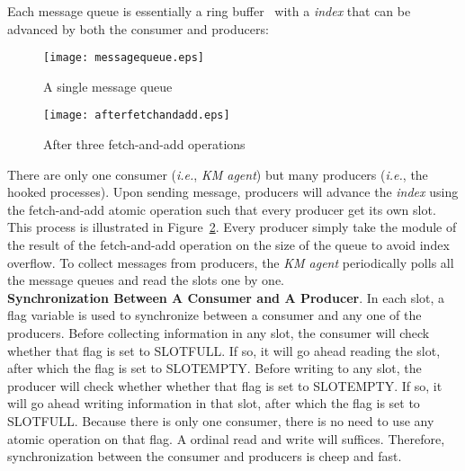 \documentclass[letterpaper,twocolumn,10pt]{article}
\begin{document}
Each message queue is essentially a ring buffer~\cite{ringbufferLee:2009,
Lynx:2016} with a \textit{index} that can be advanced by both the consumer and
producers: 

\begin{subfigures}
    \begin{figure}[H]
    \centering
    \texttt{[image: messagequeue.eps]}
    \caption{\label{fig:singlemq}A single message queue}
\end{figure}
    \begin{figure}[H]
    \centering
    \texttt{[image: afterfetchandadd.eps]}
    \caption{\label{fig:afterfa}After three fetch-and-add operations}
\end{figure}
\end{subfigures}

\noindent
There are only one consumer (\textit{i.e.}, \textit{KM agent}) but many
producers (\textit{i.e.}, the hooked processes). Upon sending message,
producers will advance the \textit{index} using the fetch-and-add atomic
operation such that every producer get its own slot. This process is
illustrated in Figure~\ref{fig:afterfa}. Every producer simply take the
module of the result of the fetch-and-add operation on the size of the queue
to avoid index overflow. To collect messages from producers, the \textit{KM
agent} periodically polls all the message queues and read the slots one by
one.\\ 

\noindent
\textbf{Synchronization Between A Consumer and A Producer}. In each slot, a
flag variable is used to synchronize between a consumer and any one of the
producers. Before collecting information in any slot, the consumer will check
whether that flag is set to SLOTFULL. If so, it will go ahead reading the
slot, after which the flag is set to SLOTEMPTY. Before writing to any slot,
the producer will check whether whether that flag is set to SLOTEMPTY. If so,
it will go ahead writing information in that slot, after which the flag is
set to SLOTFULL. Because there is only one consumer, there is no need to use
any atomic operation on that flag. A ordinal read and write will suffices.
Therefore, synchronization between the consumer and producers is cheep and
fast.\\
\end{document}
